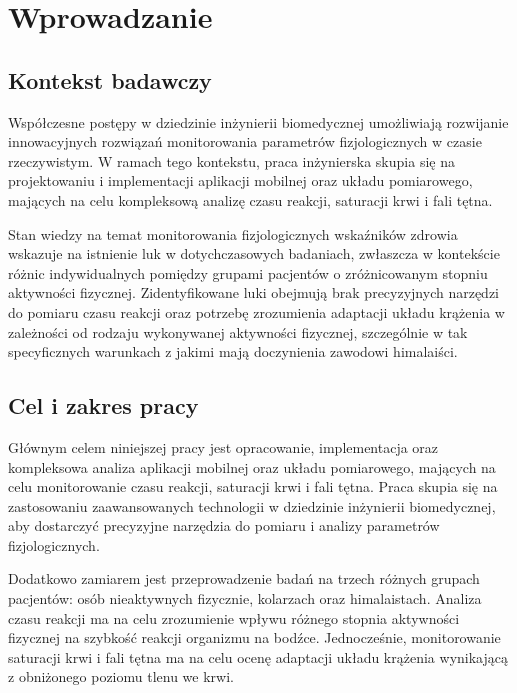\chapter{Wprowadzanie}
\section{Kontekst badawczy}
Współczesne postępy w dziedzinie inżynierii biomedycznej umożliwiają rozwijanie innowacyjnych rozwiązań monitorowania parametrów fizjologicznych w czasie rzeczywistym. W ramach tego kontekstu, praca inżynierska skupia się na projektowaniu i implementacji aplikacji mobilnej oraz układu pomiarowego, mających na celu kompleksową analizę czasu reakcji, saturacji krwi i fali tętna.

Stan wiedzy na temat monitorowania fizjologicznych wskaźników zdrowia wskazuje na istnienie luk w dotychczasowych badaniach, zwłaszcza w kontekście różnic indywidualnych pomiędzy grupami pacjentów o zróżnicowanym stopniu aktywności fizycznej. Zidentyfikowane luki obejmują brak precyzyjnych narzędzi do pomiaru czasu reakcji oraz potrzebę zrozumienia adaptacji układu krążenia w zależności od rodzaju wykonywanej aktywności fizycznej, szczególnie w tak specyficznych warunkach z jakimi mają doczynienia zawodowi himalaiści.
\section{Cel i zakres pracy}
Głównym celem niniejszej pracy jest opracowanie, implementacja oraz kompleksowa analiza aplikacji mobilnej oraz układu pomiarowego, mających na celu monitorowanie czasu reakcji, saturacji krwi i fali tętna. Praca skupia się na zastosowaniu zaawansowanych technologii w dziedzinie inżynierii biomedycznej, aby dostarczyć precyzyjne narzędzia do pomiaru i analizy parametrów fizjologicznych.

Dodatkowo zamiarem jest przeprowadzenie badań na trzech różnych grupach pacjentów: osób nieaktywnych fizycznie, kolarzach oraz himalaistach. Analiza czasu reakcji ma na celu zrozumienie wpływu różnego stopnia aktywności fizycznej na szybkość reakcji organizmu na bodźce. Jednocześnie, monitorowanie saturacji krwi i fali tętna ma na celu ocenę adaptacji układu krążenia wynikającą z obniżonego poziomu tlenu we krwi.
